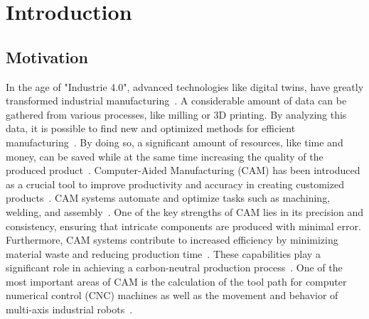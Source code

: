 \chapter{Introduction}%
\section{Motivation}%

In the age of "Industrie 4.0", advanced technologies like digital twins, have greatly transformed industrial manufacturing~\cite{Singh.2021}. A considerable amount of data can be gathered from various processes, like milling or 3D printing. By analyzing this data, it is possible to find new and optimized methods for efficient manufacturing~\cite{Ghobakhloo.2020}. By doing so, a significant amount of resources, like time and money, can be saved while at the same time increasing the quality of the produced product~\cite{Bibby.2018,Simonis.2016}.\newline
Computer-Aided Manufacturing (CAM) has been introduced as a crucial tool to improve productivity and accuracy in creating customized products~\cite{Feldhausen.2022}. CAM systems automate and optimize tasks such as machining, welding, and assembly~\cite{LalitNarayan.2013b}. One of the key strengths of CAM lies in its precision and consistency, ensuring that intricate components are produced with minimal error. Furthermore, CAM systems contribute to increased efficiency by minimizing material waste and reducing production time~\cite{Dubovska.2014}. These capabilities play a significant role in achieving a carbon-neutral production process~\cite{Saxena.2020}. One of the most important areas of CAM is the calculation of the tool path for computer numerical control (CNC) machines as well as the movement and behavior of multi-axis industrial robots~\cite{Pan}. \newline


